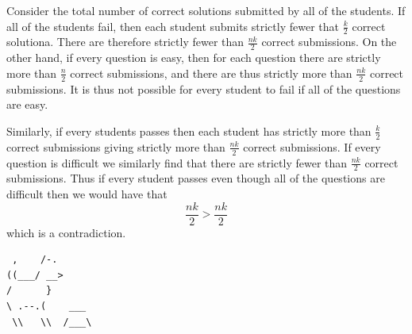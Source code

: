 \documentclass{article}
\begin{document}
\begin{enumerate}[1.]
Consider the total number of correct solutions submitted by all of the students. If all of the students fail, then each student submits strictly fewer that $\frac{k}{2}$ correct solutiona. There are therefore strictly fewer than $\frac{nk}{2}$ correct submissions. On the other hand, if every question is easy, then for each question there are strictly more than $\frac{n}{2}$ correct submissions, and there are thus strictly more than $\frac{nk}{2}$ correct submissions. It is thus not possible for every student to fail if all of the questions are easy.

Similarly, if every students passes then each student has strictly more than $\frac{k}{2}$ correct submissions giving strictly more than $\frac{nk}{2}$ correct submissions. If every question is difficult we similarly find that there are strictly fewer than $\frac{nk}{2}$ correct submissions. Thus if every student passes even though all of the questions are difficult then we would have that
\[
	\frac{nk}{2} > \frac{nk}{2}
\]
which is a contradiction.


\end{enumerate}


\vfill
\centering
\begin{BVerbatim}
 ,    /-.
((___/ __>
/      }
\ .--.(    ___
 \\   \\  /___\
\end{BVerbatim}
\end{document}
